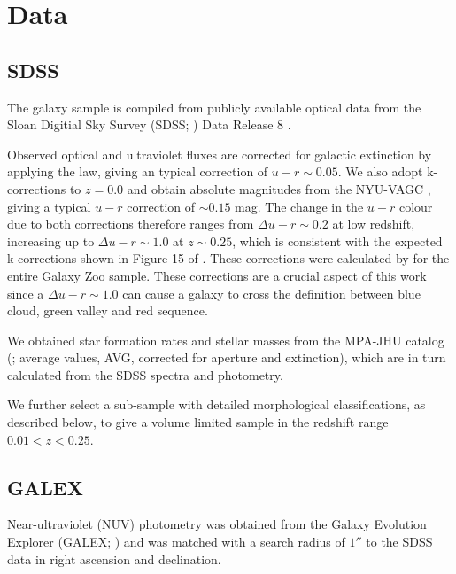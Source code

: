 \section{Data}\label{sec:data}

\subsection{SDSS}\label{sec:sdssintro}

The galaxy sample is compiled from publicly available optical data from the Sloan Digitial Sky Survey (SDSS; \citealt{York00}) Data Release 8 \citep{Aihara11}. 

Observed optical and ultraviolet fluxes are corrected for galactic extinction \citep{Oh11} by applying the \citet*{Cardelli89} law, giving an typical correction of $u-r \sim 0.05$. We also adopt k-corrections to $z=0.0$ and obtain absolute magnitudes from the NYU-VAGC \citep{Blanton05, padmanabhan08, blanton07}, giving a typical $u-r$ correction of $\sim 0.15$ mag. The change in the $u-r$ colour due to both corrections therefore ranges from $\Delta u-r \sim 0.2$ at low redshift, increasing up to $\Delta u-r \sim 1.0$ at $z \sim 0.25$, which is consistent with the expected k-corrections shown in Figure 15 of \citet{blanton07}. These corrections were calculated by \citet{Bamford09} for the entire Galaxy Zoo sample. These corrections are a crucial aspect of this work since a $\Delta u-r \sim 1.0$ can cause a galaxy to cross the definition between blue cloud, green valley and red sequence.

We obtained star formation rates and stellar masses from the MPA-JHU catalog (\citealt{kauffmann03, brinchmann04}; average values, \textsc{AVG}, corrected for aperture and extinction), which are in turn calculated from the SDSS spectra and photometry. 

We further select a sub-sample with detailed morphological classifications, as described below,  to give a volume limited sample in the redshift range $0.01 < z < 0.25$.


\subsection{GALEX}\label{sec:galexintro}

Near-ultraviolet (NUV) photometry was obtained from the Galaxy Evolution Explorer (GALEX; \citealt{Martin05}) and was matched with a search radius of $1''$ to the SDSS data in right ascension and declination. 

